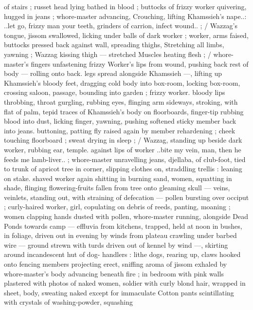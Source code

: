 of stairs ; russet head lying bathed in blood ; buttocks of frizzy 
worker quivering, hugged in jeans ; whore-master advancing, 
Crouching, lifting Khamssieh's nape..: {\gl}..let go, frizzy man{\thd} your 
teeth, grinders of carrion, infect wound..{\gr} ; {\slash} Wazzag's tongue, 
jissom swallowed, licking under balls of dark worker ; worker, arms 
faised, buttocks pressed back against wall, spreading thighs, 
Stretching all limbs, yawning ; Wazzag kissing thigh --- stretched 
Muscles heating flesh ; {\slash} whore-master's fingers unfastening frizzy 
Worker's lips from wound, pushing back rest of body --- rolling onto 
back. legs spread alongside Khamssieh ---, lifting up Khamssieh's 
bloody feet, dragging cold body into box-room, locking box-room, 
crossing saloon, passage, bounding into garden ; frizzy worker. 
bloody lips throbbing, throat gurgling, rubbing eyes, flinging arm 
sideways, stroking, with flat of palm, tepid traces of Khamssieh's 
body on floorboards, finger-tip rubbing blood into dust, licking 
finger, yawning, pushing softened sticky member back into jeans. 
buttoning, patting fly raised again by member rehardening ; cheek 
touching floorboard ; sweat drying in sleep ; {\slash} Wazzag, standing up 
beside dark worker, rubbing ear, temple. against lips of worker 
{\gl}..bite my vein, man, then he feeds me lamb-liver..{\gr} ; whore-master 
unravelling jeans, djellaba, of club-foot, tied to trunk of apricot tree 
in corner, slipping clothes on, straddling trellis : leaning on stake. 
shaved worker again shitting in burning sand, women, squatting in 
shade, flinging flowering-fruits fallen from tree onto gleaming skull 
--- veins, veinlets, standing out, with straining of defecation --- 
pollen bursting over occiput ; curly-haired worker, girl, copulating on 
debris of reeds, panting, moaning ; women clapping hands dusted 
with pollen, whore-master running, alongside {\gl} Dead Ponds {\gr} 
towards camp --- effluvia from kitchens, trapped, held at noon in 
bushes, in foliage, driven out in evening by winds from plateau 
crawling under barbed wire --- ground strewn with turds driven out 
of kennel by wind ---, skirting around incandescent hut of dog- 
handlers : lithe dogs, rearing up, claws hooked onto fencing 
members projecting erect, sniffing aroma of jissom exhaled by 
whore-master's body advancing beneath fire ; in bedroom with pink 
walls plastered with photos of naked women, soldier with curly blond 
hair, wrapped in sheet, body, sweating naked except for immaculate 
Cotton pants scintillating with crystals of washing-powder, squashing 
